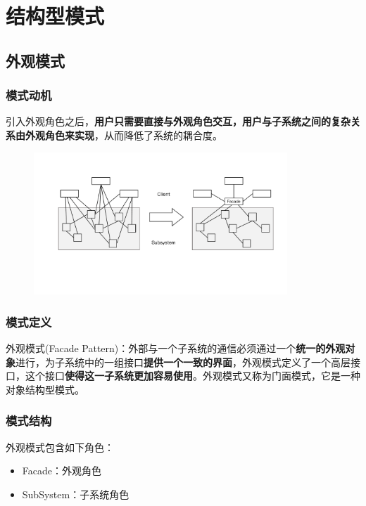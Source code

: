 \section{结构型模式}

\subsection{外观模式}

\subsubsection{模式动机}
引入外观角色之后，\textbf{用户只需要直接与外观角色交互，用户与子系统之间的复杂关系由外观角色来实现}，从而降低了系统的耦合度。
\begin{figure}[H]
    \vspace{-0.5em}
	\centering
	\includegraphics[width=0.85\textwidth]{images/外观模式动机.pdf}
    \vspace{-1em}
\end{figure}

\subsubsection{模式定义}
外观模式(Facade Pattern)：外部与一个子系统的通信必须通过一个\textbf{统一的外观对象}进行，为子系统中的一组接口\textbf{提供一个一致的界面}，外观模式定义了一个高层接口，这个接口\textbf{使得这一子系统更加容易使用}。外观模式又称为门面模式，它是一种对象结构型模式。

\subsubsection{模式结构}
外观模式包含如下角色：
\vspace{-0.8em}
\begin{multicols}{2}
    \begin{itemize}
        \item Facade：外观角色
        \item SubSystem：子系统角色
    \end{itemize}
\end{multicols}
\vspace{-1em}

